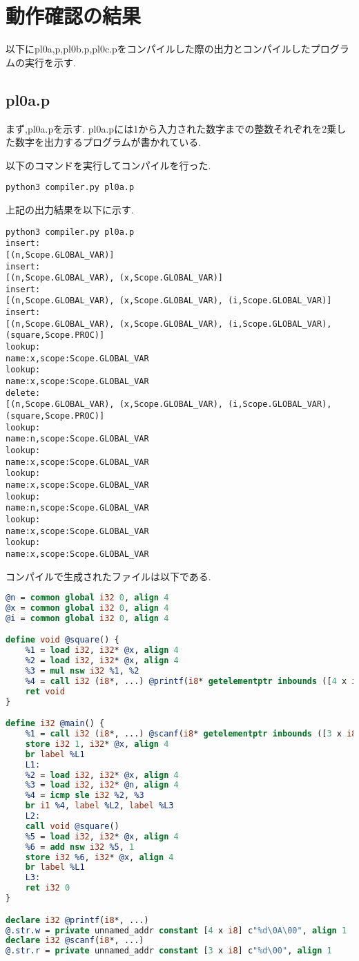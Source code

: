 \documentclass[main]{subfiles}
\begin{document}
\section{動作確認の結果}
以下にpl0a,p,pl0b.p,pl0c.pをコンパイルした際の出力とコンパイルしたプログラムの実行を示す.
\subsection{pl0a.p}
まず,pl0a.pを示す.
pl0a.pには1から入力された数字までの整数それぞれを2乗した数字を出力するプログラムが書かれている.

以下のコマンドを実行してコンパイルを行った.
\begin{oframed}
\begin{verbatim}
python3 compiler.py pl0a.p
\end{verbatim}
\end{oframed}
上記の出力結果を以下に示す.
\begin{lstlisting}[caption=python3 compiler.py pl0a.pの出力]
python3 compiler.py pl0a.p
insert:
[(n,Scope.GLOBAL_VAR)]
insert:
[(n,Scope.GLOBAL_VAR), (x,Scope.GLOBAL_VAR)]
insert:
[(n,Scope.GLOBAL_VAR), (x,Scope.GLOBAL_VAR), (i,Scope.GLOBAL_VAR)]
insert:
[(n,Scope.GLOBAL_VAR), (x,Scope.GLOBAL_VAR), (i,Scope.GLOBAL_VAR), (square,Scope.PROC)]
lookup:
name:x,scope:Scope.GLOBAL_VAR
lookup:
name:x,scope:Scope.GLOBAL_VAR
delete:
[(n,Scope.GLOBAL_VAR), (x,Scope.GLOBAL_VAR), (i,Scope.GLOBAL_VAR), (square,Scope.PROC)]
lookup:
name:n,scope:Scope.GLOBAL_VAR
lookup:
name:x,scope:Scope.GLOBAL_VAR
lookup:
name:x,scope:Scope.GLOBAL_VAR
lookup:
name:n,scope:Scope.GLOBAL_VAR
lookup:
name:x,scope:Scope.GLOBAL_VAR
lookup:
name:x,scope:Scope.GLOBAL_VAR
\end{lstlisting}
コンパイルで生成されたファイルは以下である.
\begin{lstlisting}[caption=pl0a.pのコンパイルで生成されたresult.ll,language=LLVM]
@n = common global i32 0, align 4
@x = common global i32 0, align 4
@i = common global i32 0, align 4

define void @square() {
    %1 = load i32, i32* @x, align 4
    %2 = load i32, i32* @x, align 4
    %3 = mul nsw i32 %1, %2
    %4 = call i32 (i8*, ...) @printf(i8* getelementptr inbounds ([4 x i8], [4 x i8]* @.str.w, i64 0, i64 0), i32 %3)
    ret void
}

define i32 @main() {
    %1 = call i32 (i8*, ...) @scanf(i8* getelementptr inbounds ([3 x i8], [3 x i8]* @.str.r, i64 0, i64 0), i32* @n)
    store i32 1, i32* @x, align 4
    br label %L1
    L1:
    %2 = load i32, i32* @x, align 4
    %3 = load i32, i32* @n, align 4
    %4 = icmp sle i32 %2, %3
    br i1 %4, label %L2, label %L3
    L2:
    call void @square()
    %5 = load i32, i32* @x, align 4
    %6 = add nsw i32 %5, 1
    store i32 %6, i32* @x, align 4
    br label %L1
    L3:
    ret i32 0
}

declare i32 @printf(i8*, ...)
@.str.w = private unnamed_addr constant [4 x i8] c"%d\0A\00", align 1
declare i32 @scanf(i8*, ...)
@.str.r = private unnamed_addr constant [3 x i8] c"%d\00", align 1
\end{lstlisting}
\end{document}
